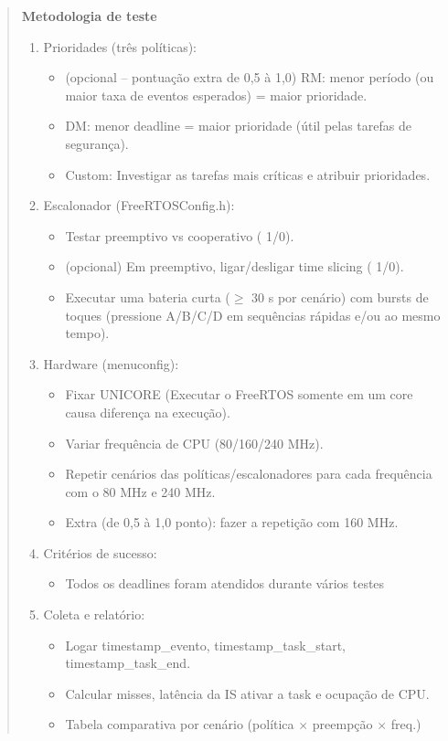 \begin{quote}
\textbf{Metodologia de teste}
\begin{enumerate}
\item Prioridades (três políticas):
\begin{itemize}
\item (opcional -- pontuação extra de 0,5 à 1,0) RM: menor período (ou maior taxa de eventos esperados) = maior prioridade.
\item DM: menor deadline = maior prioridade (útil pelas tarefas de segurança).
\item Custom: Investigar as tarefas mais críticas e atribuir prioridades.
\end{itemize}
\item Escalonador (FreeRTOSConfig.h):
\begin{itemize}
\item Testar preemptivo vs cooperativo ( 1/0).
\item (opcional) Em preemptivo, ligar/desligar time slicing ( 1/0).
\item Executar uma bateria curta ($\geq$ 30 s por cenário) com bursts de toques (pressione A/B/C/D em sequências rápidas e/ou ao mesmo tempo).
\end{itemize}
\item Hardware (menuconfig):
\begin{itemize}
\item Fixar UNICORE (Executar o FreeRTOS somente em um core causa diferença na execução).
\item Variar frequência de CPU (80/160/240 MHz).
\item Repetir cenários das políticas/escalonadores para cada frequência com o 80 MHz e 240 MHz.
\item Extra (de 0,5 à 1,0 ponto): fazer a repetição com 160 MHz.
\end{itemize}
\item Critérios de sucesso:
\begin{itemize}
\item Todos os deadlines foram atendidos durante vários testes
\end{itemize}
\item Coleta e relatório:
\begin{itemize}
\item Logar timestamp\_evento, timestamp\_task\_start, timestamp\_task\_end.
\item Calcular misses, latência da IS ativar a task e ocupação de CPU.
\item Tabela comparativa por cenário (política $\times$ preempção $\times$ freq.)
\end{itemize}
\end{enumerate}


\end{quote}
